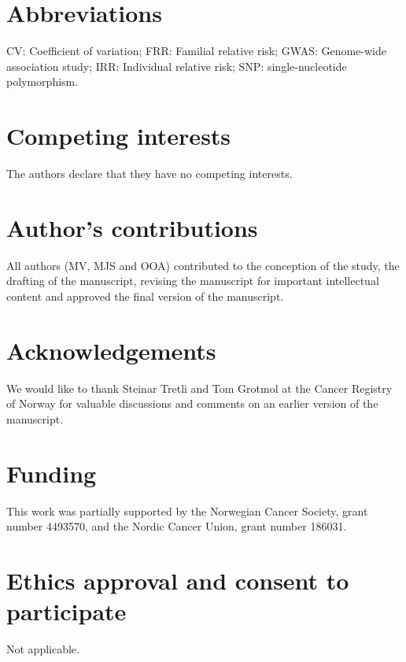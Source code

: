 \documentclass{bmcart}
\begin{document}


\begin{backmatter}

\section*{Abbreviations}
CV: Coefficient of variation; FRR: Familial relative risk; GWAS: Genome-wide association study; IRR: Individual relative risk; SNP: single-nucleotide polymorphism.

\section*{Competing interests}
The authors declare that they have no competing interests.

\section*{Author's contributions}
All authors (MV, MJS and OOA) contributed to the conception of the study, the drafting of the manuscript, revising the manuscript for important intellectual content and approved the final version of the manuscript.

\section*{Acknowledgements}
We would like to thank Steinar Tretli and Tom Grotmol at the Cancer Registry of Norway for valuable discussions and comments on an earlier version of the manuscript.

\section*{Funding}
This work was partially supported by the Norwegian Cancer Society, grant number 4493570, and the Nordic Cancer Union, grant number 186031.

\section*{Ethics approval and consent to participate}
Not applicable.


\end{backmatter}
\end{document}
